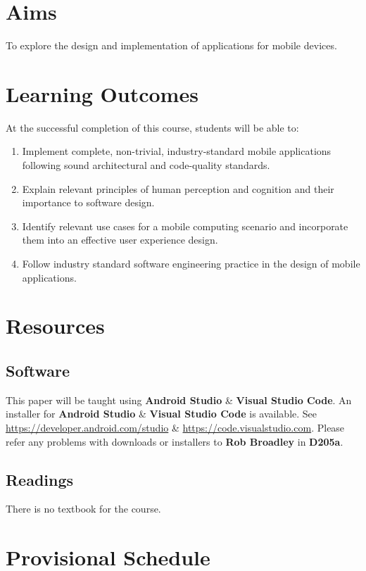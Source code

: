 \documentclass{article}
\begin{document}
\section*{Aims}
To explore the design and implementation of applications for mobile devices.

\section*{Learning Outcomes}
At the successful completion of this course, students will be able to: 
\begin{enumerate}
	\item Implement complete, non-trivial, industry-standard mobile applications following sound architectural and code-quality standards.
	\item Explain relevant principles of human perception and cognition and their importance to software design.
	\item Identify relevant use cases for a mobile computing scenario and incorporate them into an effective user experience design.
	\item Follow industry standard software engineering practice in the design of mobile applications.
\end{enumerate} 

\section*{Resources}

\subsection*{Software}
This paper will be taught using \textbf{Android Studio} \& \textbf{Visual Studio Code}. An installer for \textbf{Android Studio} \& \textbf{Visual Studio Code} is available. See \href{https://developer.android.com/studio}{https://developer.android.com/studio} \& \href{https://code.visualstudio.com}{https://code.visualstudio.com}. Please refer any problems with downloads or installers to \textbf{Rob Broadley} in \textbf{D205a}.

\subsection*{Readings}
There is no textbook for the course.

\section*{Provisional Schedule}
\end{document}
